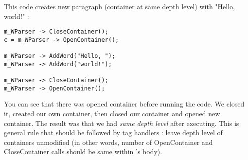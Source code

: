 
This code creates new paragraph (container at same depth level)
with "Hello, world!" :

\begin{verbatim}
m_WParser -> CloseContainer();
c = m_WParser -> OpenContainer();

m_WParser -> AddWord("Hello, ");
m_WParser -> AddWord("world!");

m_WParser -> CloseContainer();
m_WParser -> OpenContainer();
\end{verbatim}

\begin{comment}
and here is image of the situation:

\image{}{hello.bmp}
\end{comment}

You can see that there was opened container before running the code. We closed
it, created our own container, then closed our container and opened
new container. The result was that we had {\it same depth level} after
executing. This is general rule that should be followed by tag handlers :
leave depth level of containers unmodified (in other words, number of
OpenContainer and CloseContainer calls should be same within 's body).

